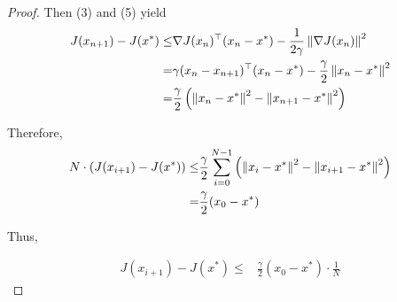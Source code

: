 \begin{proof}

Then (3) and (5) yield
\begin{align*}
    J(x_{n+1}) -  J(x^*) 
    \leq & \nabla J(x_{n})^\top (x_n-x^*)
    - \frac{1}{2 \gamma} \left\lVert\nabla J(x_n)\right\rVert^2 
    \\
    = &\gamma (x_n - x_{n+1})^\top (x_n-x^*) - \frac{\gamma}{2}\left\lVert x_n-x^*\right\rVert^2
    \\
    = & \frac{\gamma}{2} \left(
    \left\lVert x_n-x^*\right\rVert^2 - \left\lVert x_{n+1}-x^*\right\rVert^2
    \right)
\end{align*}

Therefore,
\begin{align*}
    N \cdot (J(x_{i+1}) - J(x^*))
    \leq 
    & \frac{\gamma}{2}
    \sum_{i=0}^{N-1}
    \left(
    \left\lVert x_i-x^*\right\rVert^2 - \left\lVert x_{i+1}-x^*\right\rVert^2
    \right)
    \\
    = & \frac{\gamma}{2}(x_0 - x^*)
\end{align*}

Thus,

\begin{align*}
    J(x_{i+1}) - J(x^*)
    \leq 
    &\frac{\gamma}{2}(x_0 - x^*) 
    \cdot
    \frac{1}{N}
\end{align*}





\end{proof}


